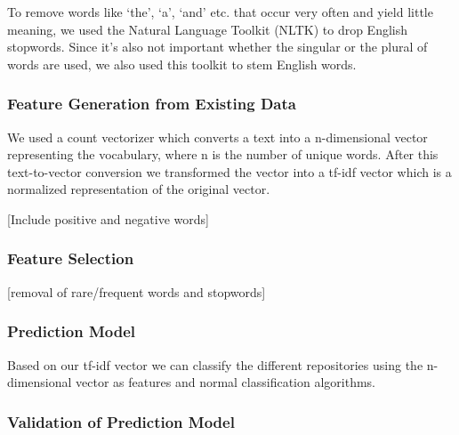 \documentclass{article}
\begin{document}
To remove words like `the', `a', `and' etc. that occur very often and
yield little meaning, we used the Natural Language Toolkit (NLTK) to
drop English stopwords. Since it's also not important whether the
singular or the plural of words are used, we also used this toolkit to
stem English words.

\subsubsection{Feature Generation from Existing
Data}\label{feature-generation-from-existing-data}

We used a count vectorizer which converts a text into a n-dimensional
vector representing the vocabulary, where n is the number of unique
words. After this text-to-vector conversion we transformed the vector
into a tf-idf vector which is a normalized representation of the
original vector.

[Include positive and negative words]

\subsubsection{Feature Selection}\label{feature-selection-1}

{[}removal of rare/frequent words and stopwords{]}

\subsubsection{Prediction Model}\label{prediction-model-1}

Based on our tf-idf vector we can classify the different repositories
using the n-dimensional vector as features and normal classification
algorithms.

\subsubsection{Validation of Prediction
Model}\label{validation-of-prediction-model-1}
\end{document}
